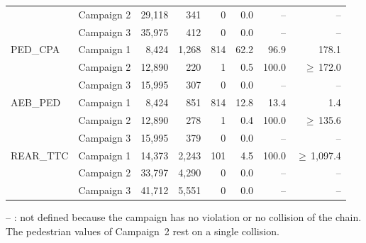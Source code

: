 \begin{table}[htbp]
\begin{tabular}{@{}llrrrrrr@{}}
 & Campaign 2 & 29,118 & 341 & 0 & 0.0 & -- & -- \\
 & Campaign 3 & 35,975 & 412 & 0 & 0.0 & -- & -- \\
PED\_CPA & Campaign 1 & 8,424 & 1,268 & 814 & 62.2 & 96.9 & 178.1 \\
 & Campaign 2 & 12,890 & 220 & 1 & 0.5 & 100.0 & $\geq$\,172.0 \\
 & Campaign 3 & 15,995 & 307 & 0 & 0.0 & -- & -- \\
AEB\_PED & Campaign 1 & 8,424 & 851 & 814 & 12.8 & 13.4 & 1.4 \\
 & Campaign 2 & 12,890 & 278 & 1 & 0.4 & 100.0 & $\geq$\,135.6 \\
 & Campaign 3 & 15,995 & 379 & 0 & 0.0 & -- & -- \\
REAR\_TTC & Campaign 1 & 14,373 & 2,243 & 101 & 4.5 & 100.0 & $\geq$\,1,097.4 \\
 & Campaign 2 & 33,797 & 4,290 & 0 & 0.0 & -- & -- \\
 & Campaign 3 & 41,712 & 5,551 & 0 & 0.0 & -- & -- \\
\bottomrule
\end{tabular}
\par\smallskip\footnotesize\raggedright -- : not defined because the campaign has no violation or no collision of the chain. The pedestrian values of Campaign~2 rest on a single collision.
\end{table}


